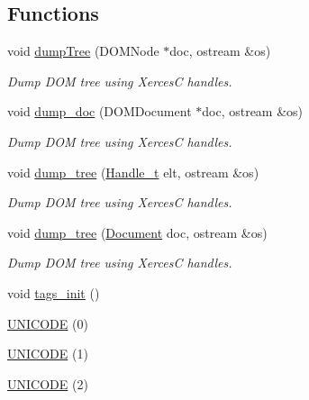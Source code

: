 \subsection*{Functions}
\begin{DoxyCompactItemize}
\item 
void \hyperlink{namespace_d_d4hep_1_1_x_m_l_a5378d08fbf2f2c9e495fc772360b62d8}{dumpTree} (DOMNode $\ast$doc, ostream \&os)
\begin{DoxyCompactList}\small\item\em Dump DOM tree using XercesC handles. \item\end{DoxyCompactList}\item 
void \hyperlink{namespace_d_d4hep_1_1_x_m_l_ae465472cdddbe11a365f14b04b15b191}{dump\_\-doc} (DOMDocument $\ast$doc, ostream \&os)
\begin{DoxyCompactList}\small\item\em Dump DOM tree using XercesC handles. \item\end{DoxyCompactList}\item 
void \hyperlink{namespace_d_d4hep_1_1_x_m_l_a1130069b87e258d98105350c812835dd}{dump\_\-tree} (\hyperlink{class_d_d4hep_1_1_x_m_l_1_1_handle__t}{Handle\_\-t} elt, ostream \&os)
\begin{DoxyCompactList}\small\item\em Dump DOM tree using XercesC handles. \item\end{DoxyCompactList}\item 
void \hyperlink{namespace_d_d4hep_1_1_x_m_l_a890f94a51fe7c0a877ec482ec35caaf9}{dump\_\-tree} (\hyperlink{class_d_d4hep_1_1_x_m_l_1_1_document}{Document} doc, ostream \&os)
\begin{DoxyCompactList}\small\item\em Dump DOM tree using XercesC handles. \item\end{DoxyCompactList}\item 
void \hyperlink{namespace_d_d4hep_1_1_x_m_l_af7aa83aefe34bc63c5dd562d27340edd}{tags\_\-init} ()
\item 
\hyperlink{namespace_d_d4hep_1_1_x_m_l_a93070fb4882b0fcf3726cc26cc153107}{UNICODE} (0)
\item 
\hyperlink{namespace_d_d4hep_1_1_x_m_l_adf9293344b1af9d8e590c4992702e11e}{UNICODE} (1)
\item 
\hyperlink{namespace_d_d4hep_1_1_x_m_l_a43539455d51d957b9af79253c6b86d31}{UNICODE} (2)

\end{DoxyCompactItemize}
